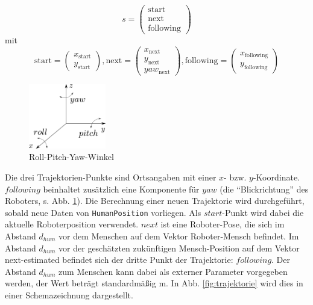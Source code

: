 \begin{equation}
	s =	\begin{pmatrix} \text{start} \\ \text{next} \\ \text{following} \end{pmatrix}
\end{equation}
mit 
\begin{equation}
	\text{start} = 		\begin{pmatrix}	x_{\text{start}} \\ 		y_{\text{start}}												\end{pmatrix},
	\text{next} = 			\begin{pmatrix} x_{\text{next}} \\ 			y_{\text{next}} \\ 		yaw_{\text{next}}	\end{pmatrix},
	\text{following} =	\begin{pmatrix}	x_{\text{following}} \\ y_{\text{following}}										\end{pmatrix}
\end{equation}

\begin{figure}[h]
	\center
	\includegraphics[width=0.3\textwidth]{graphics/roll_pitch_yaw.pdf}
	\caption{Roll-Pitch-Yaw-Winkel \cite{rollPitchYaw}}
	\label{fig:roll_pitch_yaw}
\end{figure}
Die drei Trajektorien-Punkte sind Ortsangaben mit einer $x$- bzw. $y$-Koordinate.
$following$ beinhaltet zusätzlich eine Komponente für $yaw$ (die ``Blickrichtung'' des Roboters, s. Abb. \ref{fig:roll_pitch_yaw}).
Die Berechnung einer neuen Trajektorie wird durchgeführt, sobald neue Daten von \lstinline{HumanPosition} vorliegen.
Als $start$-Punkt wird dabei die aktuelle Roboterposition verwendet.
$next$ ist eine Roboter-Pose, die sich im Abstand $d_{hum}$ vor dem Menschen auf dem Vektor Roboter-Mensch befindet.
Im Abstand $d_{hum}$ vor der geschätzten zukünftigen Mensch-Position auf dem Vektor next-estimated befindet sich der dritte Punkt der Trajektorie: $following$.
Der Abstand $d_{hum}$ zum Menschen kann dabei als externer Parameter vorgegeben werden, der Wert beträgt standardmäßig \unit[1,75]{m}.
In Abb. \ref{fig:trajektorie} wird dies in einer Schemazeichnung dargestellt.

